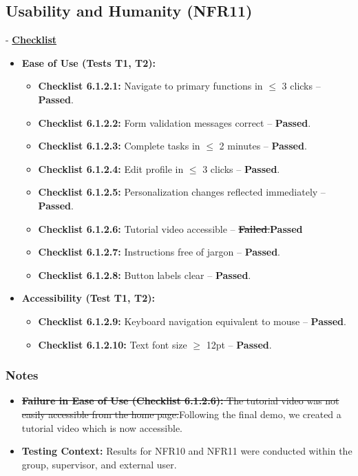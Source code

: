 \documentclass[12pt, titlepage]{article}
\begin{document}
\subsection{Usability and Humanity (NFR11)}
- \textbf{\hyperlink{checklist-nfr11}{Checklist}}
\label{nfr11}

\begin{itemize}
    \item \textbf{Ease of Use (Tests T1, T2):}  
    \begin{itemize}
        \item \textbf{Checklist 6.1.2.1:} Navigate to primary functions in $\le$ 3 clicks – \textbf{Passed}.  
        \item \textbf{Checklist 6.1.2.2:} Form validation messages correct – \textbf{Passed}.  
        \item \textbf{Checklist 6.1.2.3:} Complete tasks in $\le$ 2 minutes – \textbf{Passed}.  
        \item \textbf{Checklist 6.1.2.4:} Edit profile in $\le$ 3 clicks – \textbf{Passed}.  
        \item \textbf{Checklist 6.1.2.5:} Personalization changes reflected immediately – \textbf{Passed}.  
        \item \textbf{Checklist 6.1.2.6:} Tutorial video accessible – \st{\textbf{Failed}.}\textbf{Passed}
        \item \textbf{Checklist 6.1.2.7:} Instructions free of jargon – \textbf{Passed}.  
        \item \textbf{Checklist 6.1.2.8:} Button labels clear – \textbf{Passed}.  
    \end{itemize}
    
    \item \textbf{Accessibility (Test T1, T2):}  
    \begin{itemize}
        \item \textbf{Checklist 6.1.2.9:} Keyboard navigation equivalent to mouse – \textbf{Passed}.  
        \item \textbf{Checklist 6.1.2.10:} Text font size $\ge$ 12pt – \textbf{Passed}.  
    \end{itemize}
\end{itemize}

\subsubsection*{Notes}  
\begin{itemize}
    \item \st{\textbf{Failure in Ease of Use (Checklist 6.1.2.6):} The tutorial video was not easily accessible from the home page.}Following the final demo, we created a tutorial video which is now accessible.
    \item \textbf{Testing Context:} Results for NFR10 and NFR11 were conducted within the group, supervisor, and external user. 
\end{itemize}
\end{document}
